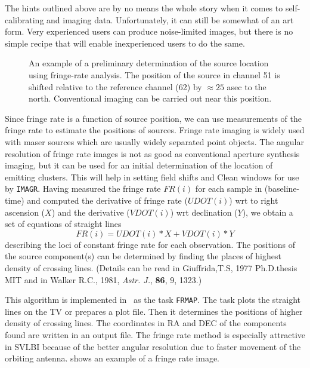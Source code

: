 \noindent The hints outlined above are by no means the whole story
when it comes to self-calibrating and imaging  data.
Unfortunately, it can still be somewhat of an art form.  Very
experienced users can produce noise-limited images, but there is no
simple recipe that will enable inexperienced users to do the same.


\begin{figure}[tb]
\centering
\caption[An example of a fringe rate image]{An example of a
preliminary determination of the source location using fringe-rate
analysis. The position of the source in channel 51 is shifted relative
to the reference channel (62) by $\approx 25$ asec to the north.
Conventional imaging can be carried out near this position.}
\label{fig:frmap}
\end{figure}

Since fringe rate is a function of source position, we can use
measurements of the fringe rate to estimate the positions of sources.
Fringe rate imaging is widely used with maser sources which are
usually widely separated point objects.  The angular resolution of
fringe rate images is not as good as conventional aperture synthesis
imaging, but it can be used for an initial determination of the
location of emitting clusters.  This will help in setting field shifts
and Clean windows for use by {\tt IMAGR}\@.  Having measured the
fringe rate $FR(i)$ for each sample in (baseline-time) and computed
the derivative of fringe rate ($UDOT(i)$) wrt to right ascension ($X$)
and the derivative ($VDOT(i)$) wrt declination ($Y$), we obtain a set
of equations of straight lines
    $$ FR(i) = UDOT(i) * X + VDOT(i) * Y$$
describing the loci of constant fringe rate for each observation.  The
positions of the source component(s) can be determined by finding the
places of highest density of crossing lines.  (Details can be read in
Giuffrida,T.S, 1977 Ph.D.thesis MIT and in Walker R.C., 1981, {\it
Astr. J.\/}, {\bf 86}, 9, 1323.)

This algorithm is implemented in \AIPS\ as the task {\tt FRMAP}\@.
The task plots the straight lines on the TV or prepares a plot file.
Then it determines the positions of higher density of crossing lines.
The coordinates in RA and DEC of the components found are written in
an output file.  The fringe rate method is especially attractive in
SVLBI because of the better angular resolution due to faster movement
of the orbiting antenna.   shows an example of a fringe
rate image.

